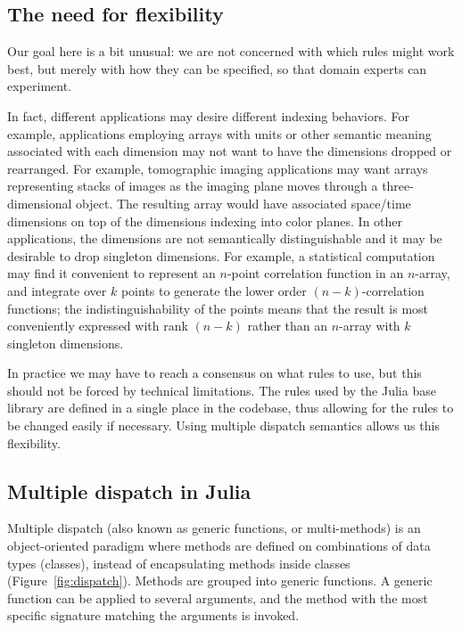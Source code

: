 \documentclass[preprint]{sigplanconf}
\begin{document}

\subsection{The need for flexibility}

Our goal here is a bit unusual: we are not concerned with which rules might
work best, but merely with how they can be specified, so that domain experts
can experiment.

In fact, different applications may desire different indexing behaviors. For
example, applications employing arrays with units or other semantic meaning
associated with each dimension may not want to have the dimensions dropped or
rearranged. For example, tomographic imaging applications may want arrays
representing stacks of images as the imaging plane moves through a three-
dimensional object. The resulting array would have associated space/time
dimensions on top of the dimensions indexing into color planes. In
other applications, the dimensions are not semantically distinguishable and it
may be desirable to drop singleton dimensions. For example, a statistical
computation may find it convenient to represent an $n$-point correlation
function in an $n$-array, and integrate over $k$ points to generate the lower
order $(n-k)$-correlation functions; the indistinguishability of the points
means that the result is most conveniently expressed with rank $(n-k)$
rather than an $n$-array with $k$ singleton dimensions.


In practice we may have to reach a consensus on what rules to use, but this
should not be forced by technical limitations. The rules used by the Julia
base library are defined in a single place in the codebase, thus allowing for
the rules to be changed easily if necessary. Using multiple dispatch semantics
allows us this flexibility.

\subsection{Multiple dispatch in Julia}

Multiple dispatch (also known as generic functions, or multi-methods) is an
object-oriented paradigm where methods are defined on combinations of data
types (classes), instead of encapsulating methods inside classes
(Figure~\ref{fig:dispatch}). Methods are
grouped into generic functions. A generic function can be applied to several
arguments, and the method with the most specific signature matching the
arguments is invoked.
\end{document}
